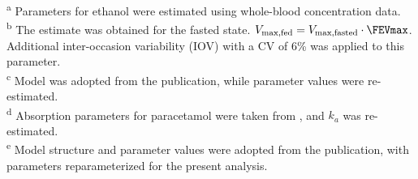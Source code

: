 \begin{flushleft}
\footnotesize
\textsuperscript{a} Parameters for ethanol were estimated using whole-blood concentration data.\\
\textsuperscript{b} The estimate was obtained for the fasted state. $V_{\text{max,fed}} = V_{\text{max,fasted}} \cdot \FEVmax$. Additional inter-occasion variability (IOV) with a CV of 6\% was applied to this parameter.\\
\textsuperscript{c} Model was adopted from the publication, while parameter values were re-estimated.\\
\textsuperscript{d} Absorption parameters for paracetamol were taken from \cite{morse2022}, and $k_a$ was re-estimated.\\
\textsuperscript{e} Model structure and parameter values were adopted from the publication, with parameters reparameterized for the present analysis.
\end{flushleft}
